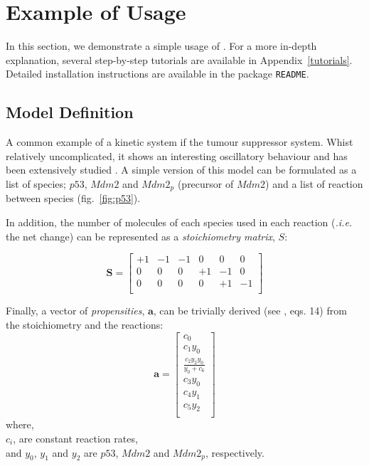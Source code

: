 \section{Example of Usage} \label{examples}
In this section, we demonstrate a simple usage of \means.
For a more in-depth explanation, several step-by-step tutorials are available in Appendix~\ref{tutorials}.
Detailed installation instructions are available in the package \texttt{README}.

\subsection{Model Definition}
A common example of a kinetic system if the \pft{} tumour suppressor system.
Whist relatively uncomplicated, it shows an interesting oscillatory behaviour and has been extensively studied \cite{geva-zatorsky_oscillations_2006, batchelor_ups_2009}.
A simple version of this model can be formulated as a list of species; $p53$, $Mdm2$ and $Mdm2_p$ (precursor of $Mdm2$) and a list of reaction between species (fig.~\ref{fig:p53}).

In addition, the number of molecules of each species used in each reaction (\emph{.i.e.} the net change) can be represented as a \emph{stoichiometry matrix}, $S$:

\[
\mathbf{S} =
\begin{bmatrix}
+1 & -1 & -1 & 0 & 0 & 0\\
0 & 0 & 0 & +1 & -1 & 0\\
0 & 0 & 0 & 0 & +1 & -1 \\
\end{bmatrix}
\]

Finally, a vector of \emph{propensities}, $\mathbf{a}$, can be trivially derived (see \cite{gillespie_general_1976}, eqs. 14) from the stoichiometry and the reactions:
\[
\mathbf{a} =
\begin{bmatrix}
c_0\\
c_1 y_0\\
\frac{c_2 y_2 y_0}{y_0+c_6}\\
c_3 y_0\\
c_4 y_1\\
c_5 y_2\\
\end{bmatrix}
\]
where,\\
$c_i$, are constant reaction rates,\\
and $y_0$, $y_1$ and $y_2$ are $p53$, $Mdm2$ and $Mdm2_p$, respectively.\\
   

